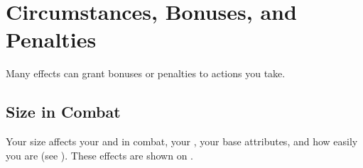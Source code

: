 \section{Circumstances, Bonuses, and Penalties}

    Many effects can grant bonuses or penalties to actions you take.

    \subsection{Size in Combat}\label{Size in Combat}
        Your size affects your  and  in combat, your , your base attributes, and how easily you are  (see ).
        These effects are shown on .

